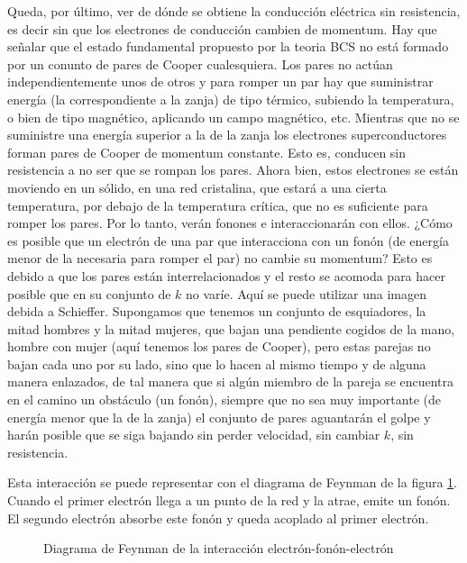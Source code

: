 Queda, por último, ver de dónde se obtiene la conducción eléctrica sin resistencia, es decir sin que los electrones de conducción cambien de momentum. Hay que señalar que el estado fundamental propuesto por la teoria BCS no está formado por un conunto de pares de Cooper cualesquiera. Los pares no actúan independientemente unos de otros y para romper un par hay que suministrar energía (la correspondiente a la zanja) de tipo térmico, subiendo la temperatura, o bien de tipo magnético, aplicando un campo magnético, etc. Mientras que no se suministre una energía superior a la de la zanja los electrones superconductores forman pares de Cooper de momentum constante. Esto es, conducen sin resistencia a no ser que se rompan los pares. Ahora bien, estos electrones se están moviendo en un sólido, en una red cristalina, que estará a una cierta temperatura, por debajo de la temperatura crítica, que no es suficiente para romper los pares. Por lo tanto, verán fonones e interaccionarán con ellos. ¿Cómo es posible que un electrón de una par que interacciona con un fonón (de energía menor de la necesaria para romper el par) no cambie su momentum? Esto es debido a que los pares están interrelacionados y el resto se acomoda para hacer posible que en su conjunto de $k$ no varíe. Aquí se puede utilizar una imagen debida a Schieffer. Supongamos que tenemos un conjunto de esquiadores, la mitad hombres y la mitad mujeres, que bajan una pendiente cogidos de la mano, hombre con mujer (aquí tenemos los pares de Cooper), pero estas parejas no bajan cada uno por su lado, sino que lo hacen al mismo tiempo y de alguna manera enlazados, de tal manera que si algún miembro de la pareja se encuentra en el camino un obstáculo (un fonón), siempre que no sea muy importante (de energía menor que la de la zanja) el conjunto de pares aguantarán el golpe y harán posible que se siga bajando sin perder velocidad, sin cambiar $k$, sin resistencia.

Esta interacción se puede representar con el diagrama de Feynman de la figura \ref{fig:feynmanefe}. Cuando el primer electrón llega a un punto de la red y la atrae, emite un fonón. El segundo electrón absorbe este fonón y queda acoplado al primer electrón.

\begin{figure}[H]
    \center
    \caption{Diagrama de Feynman de la interacción electrón-fonón-electrón}
    \label{fig:feynmanefe}
\end{figure}

